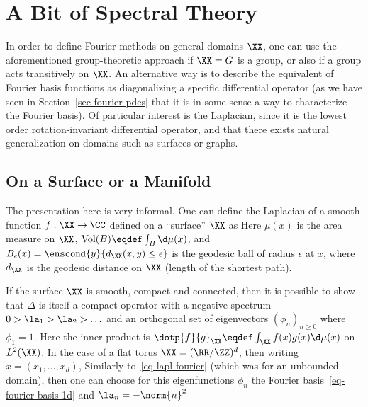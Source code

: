 %

\section{A Bit of Spectral Theory}

In order to define Fourier methods on general domains $\XX$, one can use the aforementioned group-theoretic approach if $\XX=G$ is a group, or also if a group acts transitively on $\XX$. An alternative way is to describe the equivalent of Fourier basis functions as diagonalizing a specific differential operator (as we have seen in Section~\ref{sec-fourier-pdes} that it is in some sense a way to characterize the Fourier basis). Of particular interest is the Laplacian, since it is the lowest order rotation-invariant differential operator, and that there exists natural generalization on domains such as surfaces or graphs.


\subsection{On a Surface or a Manifold}

The presentation here is very informal. One can define the Laplacian of a smooth function $f: \XX \rightarrow \CC$ defined on a ``surface'' $\XX$ as
Here $\mu(x)$ is the area measure on $\XX$, $\text{Vol}(B) \eqdef \int_B \d\mu(x)$, and $B_\epsilon(x) = \enscond{y}{d_\XX(x,y) \leq \epsilon}$ is the geodesic ball of radius $\epsilon$ at $x$, where $d_\XX$ is the geodesic distance on $\XX$ (length of the shortest path). 

If the surface $\XX$ is smooth, compact and connected, then it is possible to show that $\Delta$ is itself a compact operator with a negative spectrum $0 > \la_1 > \la_2 > \ldots$ and an orthogonal set of eigenvectors $(\phi_n)_{n \geq 0}$ where $\phi_1=1$. Here the inner product is $\dotp{f}{g}_\XX \eqdef \int_\XX f(x)g(x) \d\mu(x)$ on $L^2(\XX)$. 
%
In the case of a flat torus $\XX=(\RR/\ZZ)^d$, then writing $x=(x_1,\ldots,x_d)$, 
Similarly to~\eqref{eq-lapl-fourier} (which was for an unbounded domain), then one can choose for this eigenfunctions $\phi_n$ the Fourier basis~\eqref{eq-fourier-basis-1d} and $\la_n=-\norm{n}^2$

